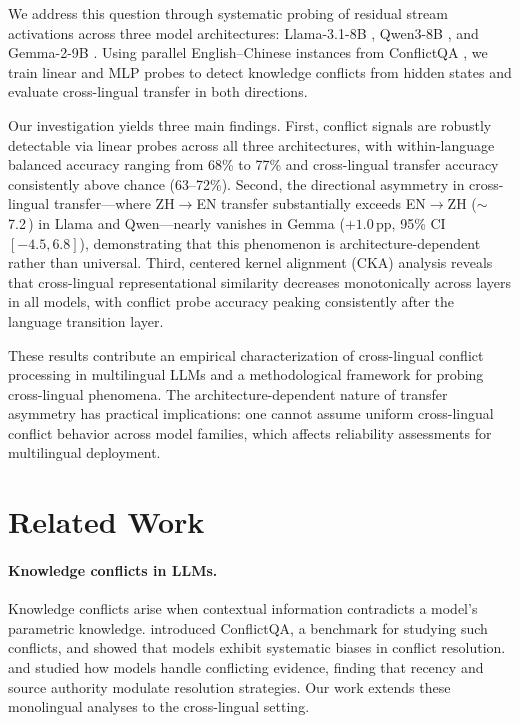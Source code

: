\documentclass[11pt]{article}
\newcommand{\pp}{\,\text{pp}}
\begin{document}
We address this question through systematic probing of residual stream activations across three model architectures: Llama-3.1-8B \citep{dubey2024llama}, Qwen3-8B \citep{yang2025qwen3}, and Gemma-2-9B \citep{team2024gemma2}.
Using parallel English--Chinese instances from ConflictQA \citep{xie2024conflictqa}, we train linear and MLP probes to detect knowledge conflicts from hidden states and evaluate cross-lingual transfer in both directions.

Our investigation yields three main findings.
First, conflict signals are robustly detectable via linear probes across all three architectures, with within-language balanced accuracy ranging from 68\% to 77\% and cross-lingual transfer accuracy consistently above chance (63--72\%).
Second, the directional asymmetry in cross-lingual transfer---where ZH$\to$EN transfer substantially exceeds EN$\to$ZH ($\sim$7.2\pp) in Llama and Qwen---nearly vanishes in Gemma ($+1.0\pp$, 95\% CI $[-4.5, 6.8]$), demonstrating that this phenomenon is architecture-dependent rather than universal.
Third, centered kernel alignment (CKA) analysis reveals that cross-lingual representational similarity decreases monotonically across layers in all models, with conflict probe accuracy peaking consistently after the language transition layer.

These results contribute an empirical characterization of cross-lingual conflict processing in multilingual LLMs and a methodological framework for probing cross-lingual phenomena.
The architecture-dependent nature of transfer asymmetry has practical implications: one cannot assume uniform cross-lingual conflict behavior across model families, which affects reliability assessments for multilingual deployment.

\section{Related Work}

\paragraph{Knowledge conflicts in LLMs.}
Knowledge conflicts arise when contextual information contradicts a model's parametric knowledge.
\citet{xie2024conflictqa} introduced ConflictQA, a benchmark for studying such conflicts, and showed that models exhibit systematic biases in conflict resolution.
\citet{chen2022rich} and \citet{longpre2021entity} studied how models handle conflicting evidence, finding that recency and source authority modulate resolution strategies.
Our work extends these monolingual analyses to the cross-lingual setting.
\end{document}
